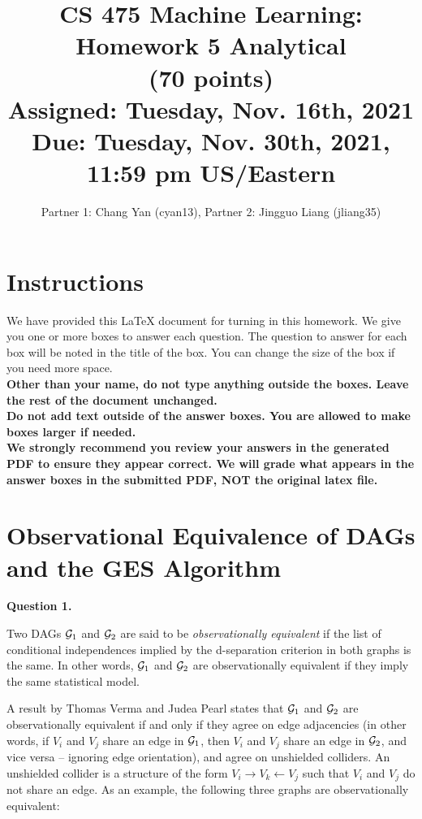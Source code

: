 \documentclass[11pt]{article}
\title{CS 475 Machine Learning: Homework 5 Analytical \\
(70 points)\\
\Large{Assigned: Tuesday, Nov. 16th, 2021} \\
\Large{Due: Tuesday, Nov. 30th, 2021, 11:59 pm US/Eastern}}
\author{Partner 1: Chang Yan (cyan13), Partner 2:  Jingguo Liang (jliang35)}
\date{}
\begin{document}
\maketitle
\thispagestyle{headings}

\section*{Instructions }
We have provided this \LaTeX{} document for turning in this homework. We give you one or more boxes to answer each question.  The question to answer for each box will be noted in the title of the box.  You can change the size of the box if you need more space.\\

{\bf Other than your name, do not type anything outside the boxes. Leave the rest of the document unchanged.}\\


\textbf{
  Do
  not add text outside of the answer boxes.  You are allowed to make boxes larger if needed.
  }\\


\textbf{We strongly recommend you review your answers in the generated PDF to
  ensure they appear correct. We will grade what appears in the answer boxes in
  the submitted PDF, NOT the original latex file.}


\pagebreak
\section*{Observational Equivalence of DAGs and the GES Algorithm}

{\bf Question 1.}

Two DAGs ${\cal G}_1$ and ${\cal G}_2$ are said to be \emph{observationally equivalent} if the list of conditional independences implied by the d-separation criterion in both graphs is the same.  In other words, ${\cal G}_1$ and ${\cal G}_2$ are observationally equivalent if they imply the same statistical model.

A result by Thomas Verma and Judea Pearl states that ${\cal G}_1$ and ${\cal G}_2$ are observationally equivalent if and only if they agree on edge adjacencies (in other words, if $V_i$ and $V_j$ share an edge in ${\cal G}_1$, then $V_i$ and $V_j$ share an edge in ${\cal G}_2$, and vice versa -- ignoring edge orientation), and agree on unshielded colliders.  An unshielded collider is a structure of the form $V_i \to V_k \gets V_j$ such that $V_i$ and $V_j$ do not share an edge.  As an example, the following three graphs are observationally equivalent:
\end{document}
